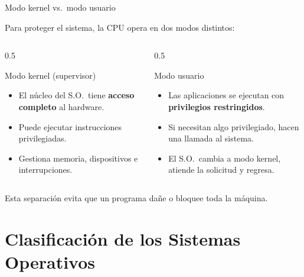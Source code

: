 \documentclass[xcolor=svgnames]{beamer}
\begin{document}
\begin{frame}{Modo kernel vs.\ modo usuario}

  Para proteger el sistema, la CPU opera en dos modos distintos:

  \vspace{0.3cm}

  \begin{columns}[T]
    \begin{column}{0.5\textwidth}
      \begin{block}{Modo kernel (supervisor)}
        \begin{itemize}
          \item El núcleo del S.O.\ tiene \textbf{acceso completo} al hardware.
          \item Puede ejecutar instrucciones privilegiadas.
          \item Gestiona memoria, dispositivos e interrupciones.
        \end{itemize}
      \end{block}
    \end{column}
    \begin{column}{0.5\textwidth}
      \begin{block}{Modo usuario}
        \begin{itemize}
          \item Las aplicaciones se ejecutan con \textbf{privilegios restringidos}.
          \item Si necesitan algo privilegiado, hacen una llamada al sistema.
          \item El S.O.\ cambia a modo kernel, atiende la solicitud y regresa.
        \end{itemize}
      \end{block}
    \end{column}
  \end{columns}

  \vspace{0.4cm}
  Esta separación evita que un programa dañe o bloquee toda la máquina.

\end{frame}

\section{Clasificación de los Sistemas Operativos}
\end{document}

